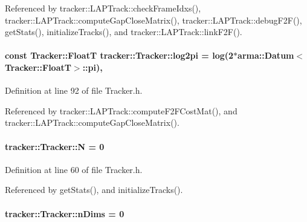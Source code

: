 Referenced by tracker\+::\+L\+A\+P\+Track\+::check\+Frame\+Idxs(), tracker\+::\+L\+A\+P\+Track\+::compute\+Gap\+Close\+Matrix(), tracker\+::\+L\+A\+P\+Track\+::debug\+F2\+F(), get\+Stats(), initialize\+Tracks(), and tracker\+::\+L\+A\+P\+Track\+::link\+F2\+F().

\paragraph[{\texorpdfstring{log2pi}{log2pi}}]{\setlength{\rightskip}{0pt plus 5cm}const {\bf Tracker\+::\+FloatT} tracker\+::\+Tracker\+::log2pi = log(2$\ast$arma\+::\+Datum$<${\bf Tracker\+::\+FloatT}$>$\+::pi)\hspace{0.3cm}{\ttfamily [static]}, {\ttfamily [protected]}}\hypertarget{classtracker_1_1Tracker_adf40b4f798f070419f5eb697b36b65ac}{}\label{classtracker_1_1Tracker_adf40b4f798f070419f5eb697b36b65ac}


Definition at line 92 of file Tracker.\+h.



Referenced by tracker\+::\+L\+A\+P\+Track\+::compute\+F2\+F\+Cost\+Mat(), and tracker\+::\+L\+A\+P\+Track\+::compute\+Gap\+Close\+Matrix().

\paragraph[{\texorpdfstring{N}{N}}]{ tracker\+::\+Tracker\+::N = 0}\hypertarget{classtracker_1_1Tracker_a5d8cb7831463035649c791311001228f}{}\label{classtracker_1_1Tracker_a5d8cb7831463035649c791311001228f}


Definition at line 60 of file Tracker.\+h.



Referenced by get\+Stats(), and initialize\+Tracks().

\paragraph[{\texorpdfstring{n\+Dims}{nDims}}]{ tracker\+::\+Tracker\+::n\+Dims = 0}\hypertarget{classtracker_1_1Tracker_a5efb17589760984816411fb6f69d561d}{}\label{classtracker_1_1Tracker_a5efb17589760984816411fb6f69d561d}


